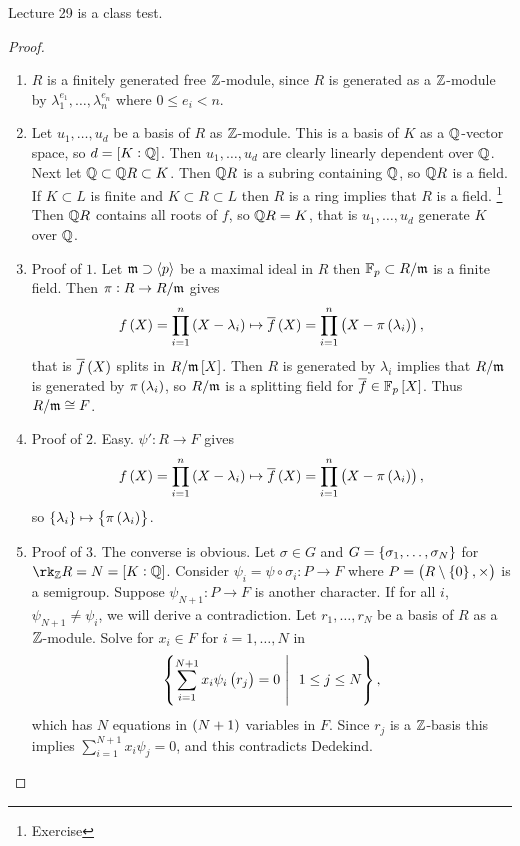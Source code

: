 
Lecture 29 is a class test.


\begin{proof}
\hfill
\begin{enumerate}[leftmargin=0.5in, label=Step \arabic*.]
\item $ R $ is a finitely generated free $ \mathbb{Z} $-module, since $ R $ is generated as a $ \mathbb{Z} $-module by $ \lambda_1^{e_1}, \dots, \lambda_n^{e_n} $ where $ 0 \le e_i < n $.
\item Let $ u_1, \dots, u_d $ be a basis of $ R $ as $ \mathbb{Z} $-module. This is a basis of $ K $ as a $ \mathbb{Q} $-vector space, so $ d = \sbr{K : \QQ} $. Then $ u_1, \dots, u_d $ are clearly linearly dependent over $ \mathbb{Q} $. Next let $ \mathbb{Q} \subset \mathbb{Q} R \subset K $. Then $ \mathbb{Q} R $ is a subring containing $ \mathbb{Q} $, so $ \mathbb{Q} R $ is a field. If $ K \subset L $ is finite and $ K \subset R \subset L $ then $ R $ is a ring implies that $ R $ is a field. \footnote{Exercise} Then $ \mathbb{Q} R $ contains all roots of $ f $, so $ \mathbb{Q} R = K $, that is $ u_1, \dots, u_d $ generate $ K $ over $ \mathbb{Q} $.
\item Proof of $ 1 $. Let $ \mathfrak{m} \supset \left\langle p \right\rangle $ be a maximal ideal in $ R $ then $ \mathbb{F}_p \subset R / \mathfrak{m} $ is a finite field. Then $ \pi : R \to R / \mathfrak{m} $ gives
$$ f\br{X} = \prod_{i = 1}^n \br{X - \lambda_i} \mapsto \overline{f}\br{X} = \prod_{i = 1}^n \br{X - \pi\br{\lambda_i}}, $$
that is $ \overline{f}\br{X} $ splits in $ R / \mmm\sbr{X} $. Then $ R $ is generated by $ \lambda_i $ implies that $ R / \mathfrak{m} $ is generated by $ \pi\br{\lambda_i} $, so $ R / \mathfrak{m} $ is a splitting field for $ \overline{f} \in \FF_p\sbr{X} $. Thus $ R / \mathfrak{m} \cong F $.
\item Proof of $ 2 $. Easy. $ \psi' : R \to F $ gives
$$ f\br{X} = \prod_{i = 1}^n \br{X - \lambda_i} \mapsto \overline{f}\br{X} = \prod_{i = 1}^n \br{X - \pi\br{\lambda_i}}, $$
so $ \cbr{\lambda_i} \mapsto \cbr{\pi\br{\lambda_i}} $.
\item Proof of $ 3 $. The converse is obvious. Let $ \sigma \in G $ and $ G = \cbr{\sigma_1, \dots, \sigma_N} $ for $ \rk_\ZZ R = N = \sbr{K : \QQ} $. Consider $ \psi_i = \psi \circ \sigma_i : P \to F $ where $ P = \br{R \setminus \cbr{0}, \times} $ is a semigroup. Suppose $ \psi_{N + 1} : P \to F $ is another character. If for all $ i $, $ \psi_{N + 1} \ne \psi_i $, we will derive a contradiction. Let $ r_1, \dots, r_N $ be a basis of $ R $ as a $ \mathbb{Z} $-module. Solve for $ x_i \in F $ for $ i = 1, \dots, N $ in
$$ \cbr{\sum_{i = 1}^{N + 1} x_i\psi_i\br{r_j} = 0 \st \ 1 \le j \le N}, $$
which has $ N $ equations in $ \br{N + 1} $ variables in $ F $. Since $ r_j $ is a $ \mathbb{Z} $-basis this implies $ \sum_{i = 1}^{N + 1} x_i\psi_j = 0 $, and this contradicts Dedekind.
\end{enumerate}
\end{proof}

